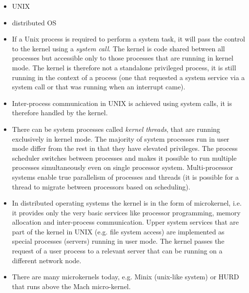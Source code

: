 
\begin{slide}
\begin{itemize}
\item UNIX\vspace{1ex}


\item distributed OS\vspace{1ex}


\end{itemize}
\end{slide}

\begin{itemize}
\item If a Unix process is required to perform a system task, it will pass the
control to the kernel using a \emph{system call}. The kernel is code shared
between all processes but accessible only to those processes that are running in
kernel mode. The kernel is therefore not a standalone privileged process, it is
still running in the context of a process (one that requested a system service
via a system call or that was running when an interrupt came).
\item Inter-process communication in UNIX is achieved using system calls,
it is therefore handled by the kernel.
\item There can be system processes called \emph{kernel threads}, that are
running exclusively in kernel mode. The majority of system processes run in user
mode differ from the rest in that they have elevated privileges.
The process scheduler switches between processes and makes it possible to run
multiple processes simultaneously even on single processor system.
Multi-processor systems enable true parallelism of processes and threads
(it is possible for a thread to migrate between processors based on scheduling).
\item In distributed operating systems the kernel is in the form of microkernel,
i.e. it provides only the very basic services like processor programming, memory
allocation and inter-process communication. Upper system services that are part
of the kernel in UNIX (e.g. file system access) are implemented as special processes
(servers) running in user mode. The kernel passes the request of a user process to a
relevant server that can be running on a different network node.
\item There are many microkernels today, e.g. Minix (unix-like system) or HURD
that runs above the Mach micro-kernel.
\end{itemize}

